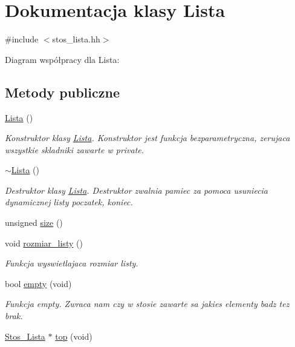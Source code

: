 \hypertarget{class_lista}{\section{\-Dokumentacja klasy \-Lista}
\label{class_lista}
}


{\ttfamily \#include $<$stos\-\_\-lista.\-hh$>$}



\-Diagram współpracy dla \-Lista\-:
\subsection*{\-Metody publiczne}
\begin{DoxyCompactItemize}
\item 
\hyperlink{class_lista_a1f668b36909182ef1360b48503529a31}{\-Lista} ()
\begin{DoxyCompactList}\small\item\em \-Konstruktor klasy \hyperlink{class_lista}{\-Lista}. \-Konstruktor jest funkcja bezparametryczna, zerujaca wszystkie skladniki zawarte w private. \end{DoxyCompactList}\item 
\hyperlink{class_lista_a4d7394b2728a00ad8404965b2e15d096}{$\sim$\-Lista} ()
\begin{DoxyCompactList}\small\item\em \-Destruktor klasy \hyperlink{class_lista}{\-Lista}. \-Destruktor zwalnia pamiec za pomoca usuniecia dynamicznej listy poczatek, koniec. \end{DoxyCompactList}\item 
unsigned \hyperlink{class_lista_a38396f51329267bafb953654a0c2099b}{size} ()
\item 
void \hyperlink{class_lista_af7b7843d6b2f93eb7ee58c8f2ca97f9f}{rozmiar\-\_\-listy} ()
\begin{DoxyCompactList}\small\item\em \-Funkcja wyswietlajaca rozmiar listy. \end{DoxyCompactList}\item 
bool \hyperlink{class_lista_a99a556013fc06ee0a33c024af5b36361}{empty} (void)
\begin{DoxyCompactList}\small\item\em \-Funkcja empty. \-Zwraca nam czy w stosie zawarte sa jakies elementy badz tez brak. \end{DoxyCompactList}\item 
\hyperlink{struct_stos___lista}{\-Stos\-\_\-\-Lista} $\ast$ \hyperlink{class_lista_acbd721b76e8db8403d46f9277331b703}{top} (void)

\end{DoxyCompactItemize}
